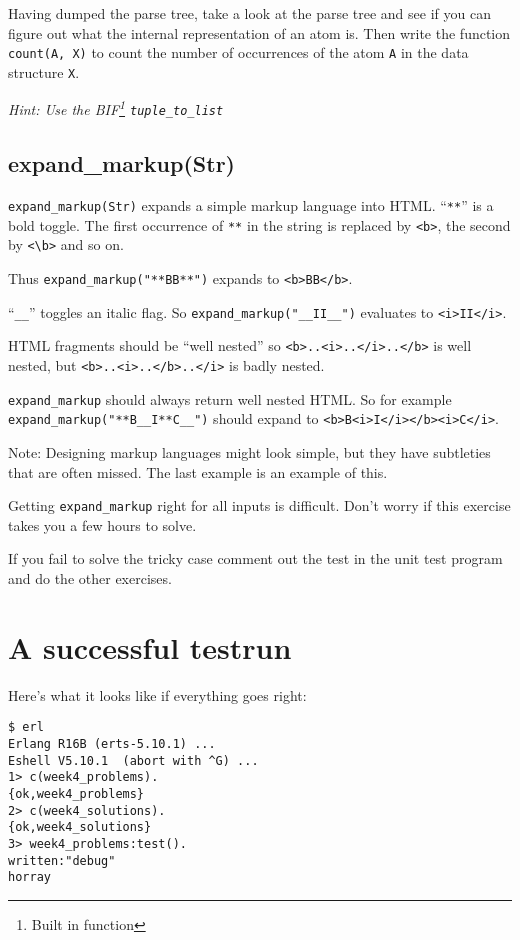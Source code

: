 \documentclass[12pt]{article}
\begin{document}
Having dumped the parse tree, take a look at the parse tree and see if
you can figure out what the internal representation of an atom
is. Then write the function \verb+count(A, X)+ to count the number of
occurrences of the atom \verb+A+ in the data structure \verb+X+.

{\sl Hint: Use the BIF\footnote{Built in function} \verb+tuple_to_list+}

\subsection{expand\_markup(Str)}

\verb+expand_markup(Str)+ expands a simple markup language into HTML.
``\verb+**+'' is a bold toggle. The first occurrence of \verb+**+ in the string
is replaced by \verb+<b>+, the second by \verb+<\b>+ and so on.

Thus \verb+expand_markup("**BB**")+ expands to \verb+<b>BB</b>+.

``\verb+__+'' toggles an italic flag. So \verb+expand_markup("__II__")+ evaluates to
\verb+<i>II</i>+.

HTML fragments should be ``well nested'' so
\verb+<b>..<i>..</i>..</b>+ is well nested, but \verb+<b>..<i>..</b>..</i>+ is
badly nested.

\verb+expand_markup+ should always return well nested HTML. 
So for example \verb+expand_markup("**B__I**C__")+ should expand
to \verb+<b>B<i>I</i></b><i>C</i>+.

Note: Designing markup languages might look simple, but they have
subtleties that are often missed. The last example is an example of
this.

Getting \verb+expand_markup+ right for all inputs is difficult.  Don't
worry if this exercise takes you a few hours to solve.

If you fail to solve the tricky case comment out the test in the unit
test program and do the other exercises.

\section{A successful testrun}

Here's what it looks like if everything goes right:

\begin{Verbatim}[frame=single]
$ erl
Erlang R16B (erts-5.10.1) ...
Eshell V5.10.1  (abort with ^G) ...
1> c(week4_problems).
{ok,week4_problems}
2> c(week4_solutions).
{ok,week4_solutions}
3> week4_problems:test().
written:"debug"
horray
\end{Verbatim}
\end{document}
